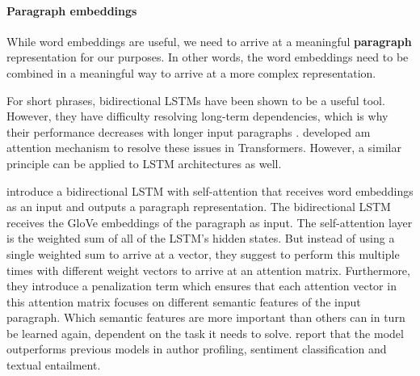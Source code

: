 \documentclass[11pt,a4paper]{article}
\begin{document}
\paragraph{Paragraph embeddings}
While word embeddings are useful, we need to arrive at a meaningful \textbf{paragraph} representation for our purposes. In other words, the word embeddings need to be combined in a meaningful way to arrive at a more complex representation.

For short phrases, bidirectional LSTMs \cite{Hochreiter:1997,Schuster:1997,Graves:2005} have been shown to be a useful tool. However, they have difficulty resolving long-term dependencies, which is why their performance decreases with longer input paragraphs \cite{Hochreiter:2001}. \cite{Vaswani:2017} developed am attention mechanism to resolve these issues in Transformers. However, a similar principle can be applied to LSTM architectures as well.

\cite{Lin:2017} introduce a bidirectional LSTM with self-attention that receives word embeddings as an input and outputs a paragraph representation. The bidirectional LSTM receives the GloVe embeddings of the paragraph as input. The self-attention layer is the weighted sum of all of the LSTM's hidden states. But instead of using a single weighted sum to arrive at a vector, they suggest to perform this multiple times with different weight vectors to arrive at an attention matrix. Furthermore, they introduce a penalization term which ensures that each attention vector in this attention matrix focuses on different semantic features of the input paragraph. Which semantic features are more important than others can in turn be learned again, dependent on the task it needs to solve. \citeauthor{Lin:2017} report that the model outperforms previous models in author profiling, sentiment classification and textual entailment.
\end{document}
